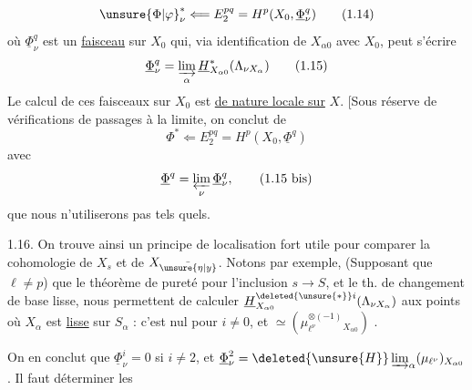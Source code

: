 \[
{\unsure{\Phi|\varphi}}^*_\nu\Longleftarrow E_2^{pq}=H^p(X_0,\underline\Phi^q_\nu)
\tag*{(1.14)}
\]
où $\underline\Phi^q_\nu$ est un \uline{faisceau} sur $X_0$ qui, via identification de $X_{\alpha0}$ avec $X_0$, peut s'écrire
\[
\underline\Phi^q_\nu=\varinjlim_\alpha\underline H^*_{X_{\alpha0}}(\Lambda_{\nu X_\alpha})
\tag*{(1.15)}
\]
Le calcul de ces faisceaux sur $X_0$ est \uline{de nature locale sur} $X$. [Sous réserve  de vérifications de passages à la limite, on conclut de 
\[
\Phi^*\Longleftarrow E_2^{pq}=H^p(X_0,\underline\Phi^q)
\tag*{(1.14 bis)}
\]
avec
\[
\underline\Phi^q=\varprojlim_\nu\underline\Phi^q_\nu,
\tag*{(1.15 bis)}
\]
 que nous n'utiliserons pas tels quels.\deleted{]}

1.16. On trouve ainsi un principe de localisation fort utile pour comparer la cohomologie de $X_s$ et de $X_{\bar{\unsure{\eta|y}}}$. Notons par exemple,  (Supposant que $\ell\ne p$) que  le théorème de pureté pour l'inclusion $s\longrightarrow S$, et le th. de changement de base lisse, nous permettent de calculer $\underline H^{\deleted{\unsure{*}}i}_{X_{\alpha0}}(\Lambda_{\nu X_\alpha})$ aux points où $X_\alpha$ est \uline{lisse} sur $S_\alpha$ : c'est nul pour $i\ne0$, et \deleted{\unsure{\simeq}} $\simeq(\mu_{\ell^\nu}^{\otimes(-1)}{}_{X_{\alpha0}})$ .

On en conclut que $\underline\Phi^i_\nu=0$ si $i\ne2$, et $\underline\Phi^2_\nu=\deleted{\unsure{H}}\varinjlim_\alpha(\mu_{\ell^\nu})_{X_{\alpha0}}$. Il faut déterminer les

